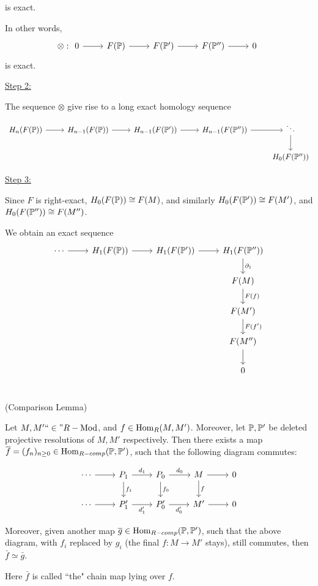 \documentclass[x11names,reqno,14pt]{extarticle}
\newcommand{\fin}{``\in"}
\newcommand{\RMod}{R-\text{Mod}}
\newcommand{\barf}{\bar{f}}
\begin{document}
is exact.

In other words, 
\[
\otimes: \exactshort{F(\mbb{P})}{}{F(\mbb{P}')}{}{F(\mbb{P}'')}
\]
is exact. 

\underline{Step 2:}

The sequence $\otimes$ give rise to a long exact homology sequence
\[
\begin{tikzcd}
H_n(F(\mbb{P}))\ar[r] & H_{n - 1}(F(\mbb{P}))\ar[r] & H_{n - 1}(F(\mbb{P}')) \ar[r] & H_{n - 1}(F(\mbb{P}''))\ar[r] & \ddots \ar[d] \\ & & & &H_0(F(\mbb{P}''))
\end{tikzcd}
\]

\underline{Step 3:}

Since $F$ is right-exact, $H_0(F(\mathbb{P})) \cong F(M)$, and similarly $H_0(F(\mathbb{P}')) \cong F(M')$, and $H_0(F(\mathbb{P}'')) \cong F(M'')$. 

We obtain an exact sequence
\[
\begin{tikzcd}
\cdots\ar[r]&H_1(F(\mbb{P})) \ar[r] & H_1(F(\mbb{P}')) \ar[r] & H_1(F(\mbb{P}'')) \ar[d, "\del_1"]\\
& & & F(M)\ar[d, "F(f)"]\\
& & & F(M') \ar[d, "F(f')"] \\
& & & F(M'') \ar[d] \\
& & & 0 \\
\end{tikzcd}
\]

\lem (Comparison Lemma)

Let $M, M' \fin \RMod$, and $f\in{\mathrm{Hom}}_R(M, M')$. Moreover, let $\mathbb{P}, \mathbb{P}'$ be deleted projective resolutions of $M, M'$ respectively. Then there exists a map $\overline{f} = (f_n)_{n\geq0}\in{\mathrm{Hom}}_{R-comp}(\mathbb{P}, \mathbb{P}')$, such that the following diagram commutes: 

\[
\begin{tikzcd}
\cdots \ar[r] & P_1 \ar[r, "d_1"]\ar[d, "f_1"] & P_0\ar[d, "f_0"] \ar[r, "d_0"] & M \ar[r]\ar[d, "f"] & 0 \\
\cdots\ar[r] & P'_1 \ar[r, "d_1'"'] & P'_0 \ar[r, "d_0'"'] & M' \ar[r] & 0 
\end{tikzcd}
\]

Moreover, given another map $\overline{g} \in {\mathrm{Hom}}_{R-comp}(\mathbb{P}, \mathbb{P}')$, such that the above diagram, with $f_i$ replaced by $g_i$ (the final $f:M\to M'$ stays), still commutes, then $\barf\simeq\bar{g}$. 

\rem Here $\barf$ is called ``the" chain map lying over $f$. 
\end{document}
